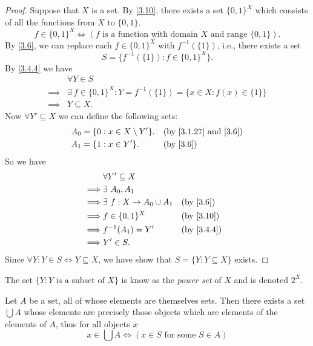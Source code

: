 \begin{proof}
  Suppose that \(X\) is a set.
  By \cref{3.10}, there exists a set \(\{0, 1\}^X\) which consists of all the functions from \(X\) to \(\{0, 1\}\).
  \[
    f \in \{0, 1\}^X \iff (f \text{ is a function with domain } X \text{ and range } \{0, 1\}).
  \]
  By \cref{3.6}, we can replace each \(f \in \{0, 1\}^X\) with \(f^{-1}(\{1\})\), i.e., there exists a set
  \[
    S = \{f^{-1}(\{1\}) : f \in \{0, 1\}^X\}.
  \]
  By \cref{3.4.4} we have
  \begin{align*}
             & \forall Y \in S                                                              \\
    \implies & \exists\ f \in \{0, 1\}^X : Y = f^{-1}(\{1\}) = \{x \in X : f(x) \in \{1\}\} \\
    \implies & Y \subseteq X.
  \end{align*}
  Now \(\forall Y' \subseteq X\) we can define the following sets:
  \begin{align*}
    A_0 & = \{0 : x \in X \setminus Y'\}. &  & \text{(by \cref{3.1.27} and \cref{3.6})} \\
    A_1 & = \{1 : x \in Y'\}.             &  & \text{(by \cref{3.6})}
  \end{align*}
  So we have
  \begin{align*}
             & \forall Y' \subseteq X                                       \\
    \implies & \exists\ A_0, A_1                                            \\
    \implies & \exists\ f : X \to A_0 \cup A_1 &  & \text{(by \cref{3.6})}  \\
    \implies & f \in \{0, 1\}^X                &  & \text{(by \cref{3.10})} \\
    \implies & f^{-1}(A_1) = Y'                &  & \by{3.4.4}              \\
    \implies & Y' \in S.
  \end{align*}
  Since \(\forall Y : Y \in S \iff Y \subseteq X\), we have show that \(S = \{Y : Y \subseteq X\}\) exists.
\end{proof}

\begin{rmk}\label{3.4.10}
  The set \(\{Y : Y \text{ is a subset of } X\}\) is know as the \emph{power set} of \(X\) and is denoted \(2^X\).
\end{rmk}

\begin{ax}[Union]\label{3.11}
  Let \(A\) be a set, all of whose elements are themselves sets.
  Then there exists a set \(\bigcup A\) whose elements are precisely those objects which are elements of the elements of \(A\), thus for all objects \(x\)
  \[
    x \in \bigcup A \iff (x \in S \text{ for some } S \in A)
  \]
\end{ax}

